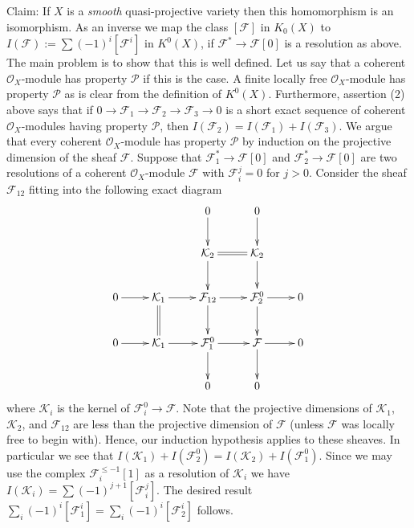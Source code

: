\medskip\noindent
Claim: If $X$ is a {\it smooth} quasi-projective variety then
this homomorphism is an isomorphism. As an inverse
we map the class $[{\mathcal F}]$ in $K_0(X)$ to $I({\mathcal F}):=
\sum (-1)^i [{\mathcal F}^i]$ in $K^0(X)$, if ${\mathcal F}^* \to {\mathcal F}[0]$
is a resolution as above. The main problem is to show that
this is well defined. Let us say that a coherent ${\mathcal O}_X$-module
has property ${\mathcal P}$ if this is the case.
A finite locally free ${\mathcal O}_X$-module has property ${\mathcal P}$
as is clear from the definition of $K^0(X)$. Furthermore,
assertion (2) above says that if
$
0
\to
{\mathcal F}_1
\to 
{\mathcal F}_2
\to 
{\mathcal F}_3
\to 
0
$
is a short exact sequence of coherent ${\mathcal O}_X$-modules having
property ${\mathcal P}$, then $I({\mathcal F}_2) = I({\mathcal F}_1) + I({\mathcal F}_3)$.
We argue that every coherent ${\mathcal O}_X$-module has property
${\mathcal P}$ by induction on the projective dimension
of the sheaf ${\mathcal F}$. Suppose that
${\mathcal F}_1^* \to {\mathcal F}[0]$ and
${\mathcal F}_2^* \to {\mathcal F}[0]$ are two resolutions of a
coherent ${\mathcal O}_X$-module ${\mathcal F}$ with ${\mathcal F}_i^j=0$
for $j > 0$. Consider the sheaf ${\mathcal F}_{12}$ fitting
into the following exact diagram
$$
\xymatrix{
& & 0\ar[d] & 0\ar[d] &
\cr
& & {\mathcal K}_2 \ar@{=}[r]\ar[d] & {\mathcal K}_2\ar[d] &
\cr
0 \ar[r] & {\mathcal K}_1\ar@{=}[d]\ar[r] & {\mathcal F}_{12}\ar[r]\ar[d] & {\mathcal F}_2^0\ar[r]\ar[d] & 0
\cr
0 \ar[r] & {\mathcal K}_1\ar[r] & {\mathcal F}_{1}^0\ar[r]\ar[d] & {\mathcal F}\ar[d]\ar[r] & 0 \cr
& & 0 & 0 & \cr}
$$
where ${\mathcal K}_i$ is the kernel of ${\mathcal F}^0_i \to {\mathcal F}$.
Note that the projective dimensions of ${\mathcal K}_1$, ${\mathcal K}_2$,
and ${\mathcal F}_{12}$ are less than the projective dimension of
${\mathcal F}$ (unless ${\mathcal F}$ was locally free to begin with). 
Hence, our induction hypothesis applies to these sheaves. In particular
we see that $I({\mathcal K}_1) + I({\mathcal F}_2^0) =
I({\mathcal K}_2) + I({\mathcal F}_1^0)$. Since we may use the complex
${\mathcal F}_i^{\leq -1}[1]$ as a resolution of ${\mathcal K}_i$ 
we have $I({\mathcal K}_i) = \sum (-1)^{j+1}[{\mathcal F}_i^j]$.
The desired result $\sum_i (-1)^i[{\mathcal F}_1^i]
= \sum_i (-1)^i[{\mathcal F}_2^i]$ follows.


